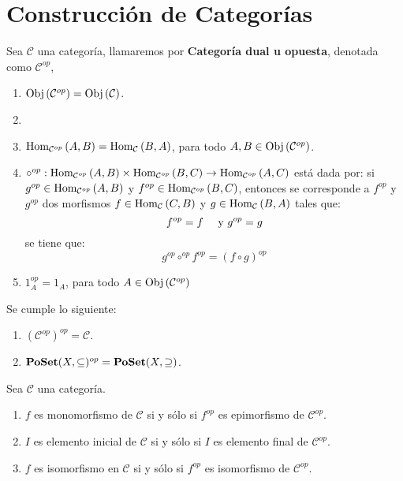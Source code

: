 \documentclass[12pt]{report}
\theoremstyle{largebreak}
\newcommand\cf[3]{\ensuremath{#1:#2\rightarrow#3}}
\newcommand{\Obj}[1]{\ensuremath{\textup{Obj}\left(#1\right)}}
\newcommand{\Hom}[3]{\ensuremath{\textup{Hom}_{#1}\left(#2,#3\right)}}
\newcommand{\Cat}[1]{\ensuremath{\textup{\textbf{#1}}}}
\begin{document}
    \section{Construcción de Categorías}

    \begin{mydef}
        Sea $\mathcal{C}$ una categoría, llamaremos por \textbf{Categoría dual u opuesta}, denotada como $\mathcal{C}^{op}$,
        \begin{enumerate}
            \item $\Obj{\mathcal{C}^{op}}=\Obj{\mathcal{C}}$.
            \item \item $\Hom{\mathcal{C}^{op}}{A}{B}=\Hom{\mathcal{C}}{B}{A}$, para todo $A,B\in\Obj{\mathcal{C}^{op}}$.
            \item $\cf{\circ^{op}}{\Hom{\mathcal{C}^{op}}{A}{B}\times \Hom{\mathcal{C}^{op}}{B}{C}}{\Hom{\mathcal{C}^{op}}{A}{C}}$ está dada por: si $g^{op}\in\Hom{\mathcal{C}^{op}}{A}{B}$ y $f^{op}\in\Hom{\mathcal{C}^{op}}{B}{C}$, entonces se corresponde a $f^{op}$ y $g^{op}$ dos morfismos $f\in\Hom{\mathcal{C}}{C}{B}$ y $g\in\Hom{\mathcal{C}}{B}{A}$ tales que:
            \begin{equation*}
                f^{op}=f\quad\textup{ y }g^{op}=g
            \end{equation*}
            se tiene que:
            \begin{equation*}
                g^{op}\circ^{op} f^{op}=(f\circ g)^{op}
            \end{equation*}
            \item $1_A^{op}=1_A$, para todo $A\in\Obj{\mathcal{C}^{op}}$
        \end{enumerate}
    \end{mydef}

    \begin{exa}
        Se cumple lo siguiente:
        \begin{enumerate}
            \item $(\mathcal{C}^{op})^{op}=\mathcal{C}$.
            \item $\Cat{PoSet}(X,\subseteq)^{op}=\Cat{PoSet}(X,\supseteq)$.
        \end{enumerate}
    \end{exa}

    \begin{propo}
        Sea $\mathcal{C}$ una categoría.
        \begin{enumerate}
            \item $f$ es monomorfismo de $\mathcal{C}$ si y sólo si $f^{op}$ es epimorfismo de $\mathcal{C}^{op}$.
            \item $I$ es elemento inicial de $\mathcal{C}$ si y sólo si $I$ es elemento final de $\mathcal{C}^{op}$.
            \item $f$ es isomorfismo en $\mathcal{C}$ si y sólo si $f^{op}$ es isomorfismo de $\mathcal{C}^{op}$.
        \end{enumerate}
    \end{propo}
\end{document}
